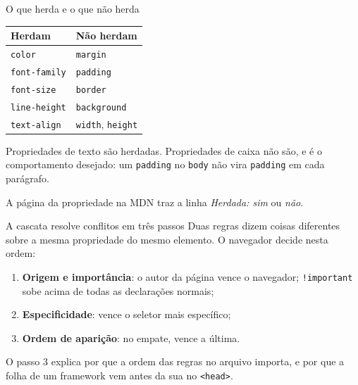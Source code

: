 \documentclass{beamer}
\begin{document}
\begin{frame}{O que herda e o que não herda}
	\begin{center}
		\begin{tabular}{ll}
			\toprule
			\textbf{Herdam}      & \textbf{Não herdam}             \\
			\midrule
			\texttt{color}       & \texttt{margin}                 \\
			\texttt{font-family} & \texttt{padding}                \\
			\texttt{font-size}   & \texttt{border}                 \\
			\texttt{line-height} & \texttt{background}             \\
			\texttt{text-align}  & \texttt{width}, \texttt{height} \\
			\bottomrule
		\end{tabular}
	\end{center}

	\vspace{0.4cm}
	Propriedades de texto são herdadas. Propriedades de caixa não são, e é o
	comportamento desejado: um \texttt{padding} no \texttt{body} não vira
	\texttt{padding} em cada parágrafo.

	\vspace{0.2cm}
	A página da propriedade na MDN traz a linha \emph{Herdada: sim} ou
	\emph{não}.
\end{frame}

\begin{frame}{A cascata resolve conflitos em três passos}
	Duas regras dizem coisas diferentes sobre a mesma propriedade do mesmo
	elemento. O navegador decide nesta ordem:

	\begin{enumerate}
		\item \textbf{Origem e importância}: o autor da página vence o navegador;
		      \texttt{!important} sobe acima de todas as declarações normais;
		\item \textbf{Especificidade}: vence o seletor mais específico;
		\item \textbf{Ordem de aparição}: no empate, vence a última.
	\end{enumerate}

	\vspace{0.4cm}
	O passo 3 explica por que a ordem das regras no arquivo importa, e por que a
	folha de um framework vem antes da sua no \texttt{<head>}.
\end{frame}
\end{document}
